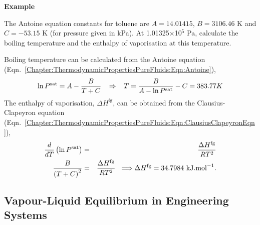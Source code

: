    \begin{MyExample}{\begin{center}{\bf Example}\end{center}}
     \begin{example}\label{Chapter:ThermodynamicPropertiesPureFluids:Example5} 
        The Antoine equation constants for toluene are $A=14.01415$, $B=3106.46$ K and $C=-53.15$ K (for pressure given in kPa). At 1.01325$\times$10$^{5}$ Pa, calculate the boiling temperature and the enthalpy of vaporisation at this temperature.
     \end{example}

       Boiling temperature can be calculated from the Antoine equation (Eqn.~\ref{Chapter:ThermodynamicPropertiesPureFluids:Eqn:Antoine}),
       \begin{displaymath}
          \ln{P^{\text{sat}}} = A - \displaystyle\frac{B}{T+C} \;\;\;\Rightarrow \;\;\; T = \displaystyle\frac{B}{A-\ln{P^{\text{sat}}}} - C = 383.77 K
       \end{displaymath}
The enthalpy of vaporisation, $\Delta H^{\text{fg}}$, can be obtained from the Clausius-Clapeyron equation (Eqn.~\ref{Chapter:ThermodynamicPropertiesPureFluids:Eqn:ClausiusClapeyronEqn}),
         \begin{eqnarray}
            \displaystyle\frac{d}{dT} \left(\ln{P^{\text{sat}}}\right) &=& \displaystyle\frac{\Delta H^{\text{fg}}}{RT^{2}} \nonumber \\
             \displaystyle\frac{B}{\left(T+C\right)^{2}} &=&  \displaystyle\frac{\Delta H^{\text{fg}}}{RT^{2}} \;\;\Longrightarrow \Delta H^{\text{fg}} = 34.7984 \text{ kJ.mol}^{-1}. \nonumber
         \end{eqnarray}
   \end{MyExample}
   


   \subsection{Vapour-Liquid Equilibrium in Engineering Systems}\label{Chapter:ThermodynamicPropertiesPureFluids:Section:VLE}

